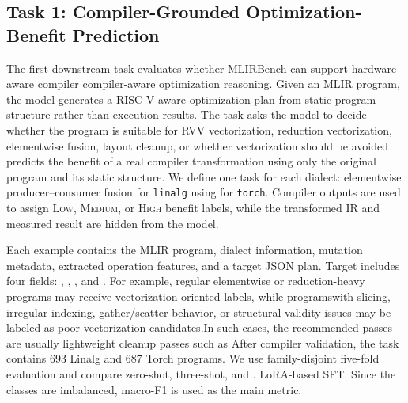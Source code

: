\documentclass[sigplan,screen,review,anonymous]{acmart}
\providecommand{\DIFadd}[1]{{\protect\color{blue} \sf #1}} %
\providecommand{\DIFdel}[1]{{\protect\color{red} \scriptsize #1}} %
\providecommand{\DIFaddbegin}{} %
\providecommand{\DIFaddend}{} %
\providecommand{\DIFdelbegin}{} %
\providecommand{\DIFdelend}{} %
\begin{document}
\DIFaddbegin \subsection{\DIFadd{Task 1: Compiler-Grounded Optimization-Benefit Prediction}}

\DIFaddend The first downstream task evaluates whether MLIRBench can support
\DIFdelbegin \DIFdel{hardware-aware compiler }\DIFdelend \DIFaddbegin \DIFadd{compiler-aware optimization }\DIFaddend reasoning. Given an MLIR program, the model
\DIFdelbegin \DIFdel{generates a RISC-V-aware optimization plan from static program structure rather than execution results. The task asks the model to decide whether the program is suitable for RVV vectorization, reduction vectorization, elementwise fusion, layout cleanup, or whether vectorization should be avoided}\DIFdelend \DIFaddbegin \DIFadd{predicts the benefit of a real compiler transformation using only the original
program and its static structure}\DIFaddend . \DIFaddbegin \DIFadd{We define one task for each dialect:
elementwise producer--consumer fusion for \texttt{linalg} using
}\path{linalg-fuse-elementwise-ops}\DIFadd{, and the
} \DIFadd{for \texttt{torch}. Compiler outputs are
used to assign \textsc{Low}, \textsc{Medium}, or \textsc{High} benefit labels,
while the transformed IR and measured result are hidden from the model.
}\DIFaddend 

\DIFdelbegin \DIFdel{Each example contains the MLIR program,
dialect information, mutation metadata, extracted operation features, and a target JSON plan. Target includes four fields: }%
\DIFdel{, }%
\DIFdel{,
}%
\DIFdel{, and }%
\DIFdel{. For example, regular elementwise or reduction-heavy programs may receive vectorization-oriented labels, while programswith slicing, irregular indexing, gather/scatter behavior, or structural validity issues may be labeled as poor vectorization candidates.In such cases, the recommended passes are usually lightweight cleanup passes such as }%
\DIFdelend \DIFaddbegin \DIFadd{After compiler validation, the task contains 693 Linalg and 687 Torch
programs. We use family-disjoint five-fold evaluation and compare zero-shot,
three-shot, }\DIFaddend and \DIFdelbegin %
\DIFdel{.}\DIFdelend \DIFaddbegin \DIFadd{LoRA-based SFT. Since the classes are imbalanced, macro-F1 is
used as the main metric.
}\DIFaddend 
\end{document}
